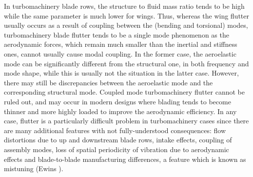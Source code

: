  In turbomachinery blade rows, the structure to fluid mass ratio tends to be
 high while the same parameter is much lower for wings. Thus, whereas the
 wing flutter usually occurs as a result of coupling between the (bending and
 torsional) modes, turbomachinery blade flutter tends to be a single mode
 phenomenon as the aerodynamic forces, which remain much smaller than the
 inertial and stiffness ones, cannot usually cause modal coupling. In the
 former case, the aeroelastic mode can be significantly different from the
 structural one, in both frequency and mode shape, while this is usually not
 the situation in the latter case. However, there may still be discrepancies
 between the aeroelastic mode and the corresponding structural mode.
 Coupled mode turbomachinery flutter cannot be ruled out, and may occur in
 modern designs where blading tends to become thinner and more highly loaded
 to improve the aerodynamic efficiency. In any case, flutter is a particularly
 difficult problem in turbomachinery cases since there are many additional
 features with not fully-understood consequences: flow distortions due to up
 and downstream blade rows, intake effects, coupling of assembly modes,
 loss of spatial periodicity of vibration due to aerodynamic effects and
 blade-to-blade manufacturing differences,
 a feature which is known as mistuning (Ewins ).

